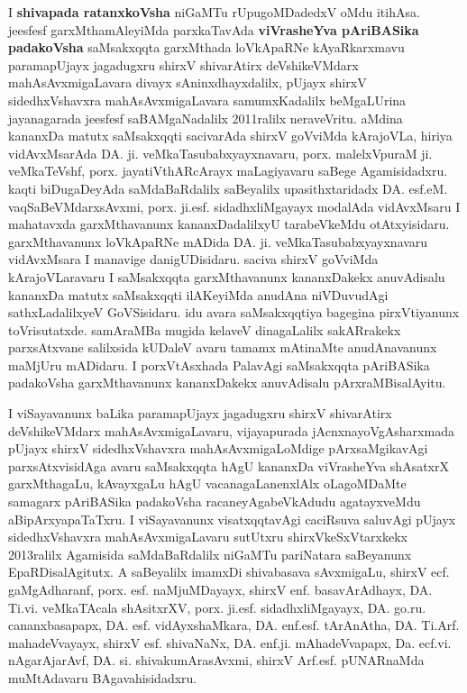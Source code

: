 I \textbf{shivapada ratanxkoVsha} niGaMTu rUpugoMDadedxV oMdu itihAsa. jeesfesf garxMthamAleyiMda parxkaTavAda \textbf{\hbox{viVrasheYva} pAriBASika padakoVsha} saMsakxqqta garxMthada loVkApaRNe kAyaRkarxmavu paramapUjayx jagadugxru shirxV shivarAtirx deVshikeVMdarx mahA\-sAvxmigaLavara divayx sAninxdhayxdalilx, pUjayx shirxV sidedhxVshavxra mahAsAvxmigaLavara samumxKadalilx beMgaLUrina jayanagarada jeesfesf saBAMgaNadalilx 2011ralilx neraveVritu. aMdina kananxDa matutx saMsakxqqti sacivarAda shirxV goVviMda \hbox{kArajoVLa}, hiriya vidAvxMsarAda DA. ji. veMkaTasubabxyayxnavaru, porx. malelxVpuraM ji. veMkaTeVshf, porx. jayatiVthARcArayx maLagiyavaru saBege Agamisidadxru. kaqti biDugaDeyAda saMdaBaRdalilx saBeyalilx upasithxtaridadx DA. esf.eM. vaqSaBeVMdarx\-sAvxmi, porx. ji.esf. sidadhx\-liMgayayx modalAda vidAvxMsaru I mahatavxda garxMthavanunx kananxDadalilxyU tarabeVkeMdu otAtxyisidaru. garxMthavanunx loVkApaRNe mADida DA. ji. veMkaTasubabxyayxnavaru \hbox{vidAvxMsara} I manavige danigUDisidaru. saciva shirxV goVviMda kArajoVLaravaru I saMsakxqqta garxMthavanunx kananxDakekx anuvAdisalu kananxDa matutx saMsakxqqti ilAKeyiMda anudAna niVDuvudAgi sathxLadalilxyeV GoVSi\-sidaru. idu avara saMsakxqqtiya bagegina pirxVtiyanunx toVrisutatxde. samAraMBa mugida kelaveV dinagaLalilx sakARrakekx parxsAtxvane salilxsida kUDaleV avaru tamamx mAtinaMte anudAnavanunx maMjUru mADidaru. I porxVtAsxhada PalavAgi saMsakxqqta pAriBASika padakoVsha garxMthavanunx kananxDakekx anuvAdisalu pArxraMBisalAyitu.

\medskip

I viSayavanunx baLika paramapUjayx jagadugxru shirxV shivarAtirx deVshikeVMdarx mahAsAvxmigaLavaru, vijayapurada jAcnxna\-yoVgAsharxmada pUjayx shirxV sidedhxVshavxra mahAsAvxmigaLoMdige  pArxsaMgikavAgi parxsAtxvisidAga avaru saMsakxqqta hAgU kananxDa \hbox{viVrasheYva} shAsatxrX garxMthagaLu, kAvayxgaLu hAgU vacanagaLanenxlAlx oLagoMDaMte samagarx pAriBASika padakoVsha racaneyAgabeVkAdudu agatayxveMdu  aBipArxyapaTaTxru. I viSayavanunx visatxqqtavAgi caciRsuva saluvAgi pUjayx sidedhxVshavxra mahAsAvxmigaLavaru sutUtxru shirxVkeSxVtarxkekx 2013ralilx Agamisida saMdaBaRdalilx niGaMTu pariNatara saBeyanunx EpaRDisalAgitutx. A saBeyalilx imamxDi shivabasava sAvxmigaLu, shirxV ecf. gaMgAdharanf, porx. esf. naMjuMDayayx, shirxV enf. \hbox{basavArAdhayx}, DA. Ti.vi. veMkaTAcala shAsitxrXV, porx. ji.esf. sidadhxliMgayayx, DA. go.ru. cananxbasapapx, DA. esf. vidAyxshaMkara, DA. enf.esf. tArAnAtha, DA. Ti.Arf. mahadeVvayayx, shirxV esf. shivaNaNx, DA. enf.ji. mAhadeVvapapx, Da. ecf.vi. nAgarAjarAvf, DA. si. shivakumArasAvxmi, shirxV Arf.esf. pUNARnaMda muMtAdavaru BAgavahisidadxru.

